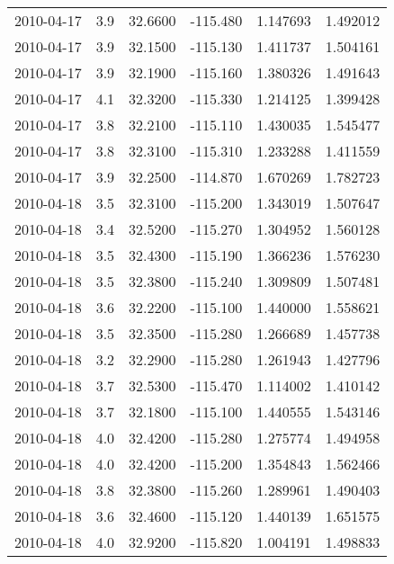 \begin{tabular}{lrrrrr}
2010-04-17 &       3.9 &  32.6600 &  -115.480 &         1.147693 &         1.492012 \\
2010-04-17 &       3.9 &  32.1500 &  -115.130 &         1.411737 &         1.504161 \\
2010-04-17 &       3.9 &  32.1900 &  -115.160 &         1.380326 &         1.491643 \\
2010-04-17 &       4.1 &  32.3200 &  -115.330 &         1.214125 &         1.399428 \\
2010-04-17 &       3.8 &  32.2100 &  -115.110 &         1.430035 &         1.545477 \\
2010-04-17 &       3.8 &  32.3100 &  -115.310 &         1.233288 &         1.411559 \\
2010-04-17 &       3.9 &  32.2500 &  -114.870 &         1.670269 &         1.782723 \\
2010-04-18 &       3.5 &  32.3100 &  -115.200 &         1.343019 &         1.507647 \\
2010-04-18 &       3.4 &  32.5200 &  -115.270 &         1.304952 &         1.560128 \\
2010-04-18 &       3.5 &  32.4300 &  -115.190 &         1.366236 &         1.576230 \\
2010-04-18 &       3.5 &  32.3800 &  -115.240 &         1.309809 &         1.507481 \\
2010-04-18 &       3.6 &  32.2200 &  -115.100 &         1.440000 &         1.558621 \\
2010-04-18 &       3.5 &  32.3500 &  -115.280 &         1.266689 &         1.457738 \\
2010-04-18 &       3.2 &  32.2900 &  -115.280 &         1.261943 &         1.427796 \\
2010-04-18 &       3.7 &  32.5300 &  -115.470 &         1.114002 &         1.410142 \\
2010-04-18 &       3.7 &  32.1800 &  -115.100 &         1.440555 &         1.543146 \\
2010-04-18 &       4.0 &  32.4200 &  -115.280 &         1.275774 &         1.494958 \\
2010-04-18 &       4.0 &  32.4200 &  -115.200 &         1.354843 &         1.562466 \\
2010-04-18 &       3.8 &  32.3800 &  -115.260 &         1.289961 &         1.490403 \\
2010-04-18 &       3.6 &  32.4600 &  -115.120 &         1.440139 &         1.651575 \\
2010-04-18 &       4.0 &  32.9200 &  -115.820 &         1.004191 &         1.498833 \\

\end{tabular}
